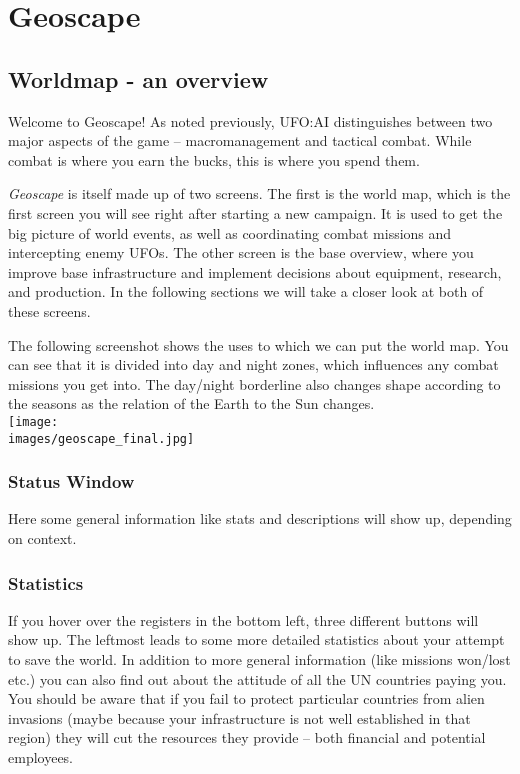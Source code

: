\section{Geoscape}

\subsection{Worldmap - an overview}
Welcome to Geoscape! As noted previously, UFO:AI distinguishes between two major aspects of the game -- macromanagement and tactical combat. While combat is where you earn the bucks, this is where you spend them.

\emph{Geoscape} is itself made up of two screens. The first is the world map, which is the first screen you will see right after starting a new campaign. It is used to get the big picture of world events, as well as coordinating combat missions and intercepting enemy UFOs. The other screen is the base overview, where you improve base infrastructure and implement decisions about equipment, research, and production. In the following sections we will take a closer look at both of these screens.

The following screenshot shows the uses to which we can put the world map. You can see that it is divided into day and night zones, which influences any combat missions you get into.  The day/night borderline also changes shape according to the seasons as the relation of the Earth to the Sun changes.\\

\texttt{[image: \\images/geoscape\_final.jpg]}

\newpage

\subsubsection{Status Window}
Here some general information like stats and descriptions will show up, depending on context.

\subsubsection{Statistics}
If you hover over the registers in the bottom left, three different buttons will show up. The leftmost leads to some more detailed statistics about your attempt to save the world. In addition to more general information (like missions won/lost etc.) you can also find out about the attitude of all the UN countries paying you. You should be aware that if you fail to protect particular countries from alien invasions (maybe because your infrastructure is not well established in that region) they will cut the resources they provide -- both financial and potential employees.

